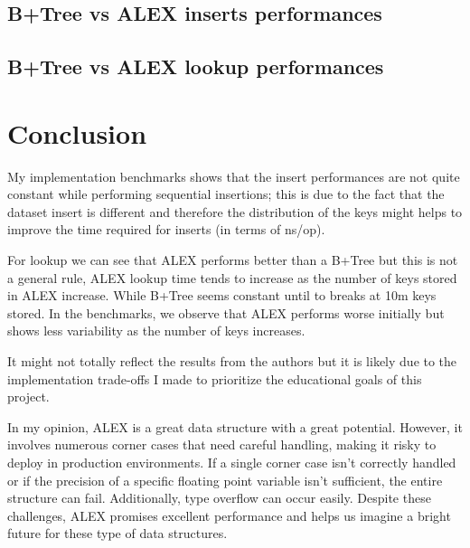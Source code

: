 \section{B+Tree vs ALEX inserts performances}
\section{B+Tree vs ALEX lookup performances}

\let\clearpage\relax
\chapter{Conclusion}
My implementation benchmarks shows that the insert performances are not quite constant while performing sequential insertions; this is due to the fact that the dataset insert is different and therefore the distribution of the keys might helps to improve the time required for inserts (in terms of ns/op).

For lookup we can see that ALEX performs better than a B+Tree but this is not a general rule, ALEX lookup time tends to increase as the number of keys stored in ALEX increase. While B+Tree seems constant until to breaks at 10m keys stored. In the benchmarks, we observe that ALEX performs worse initially but shows less variability as the number of keys increases.

It might not totally reflect the results from the authors but it is likely due to the implementation trade-offs I made to prioritize the educational goals of this project.

In my opinion, ALEX is a great data structure with a great potential. However, it involves numerous corner cases that need careful handling, making it risky to deploy in production environments. If a single corner case isn't correctly handled or if the precision of a specific floating point variable isn't sufficient, the entire structure can fail. Additionally, type overflow can occur easily. Despite these challenges, ALEX promises excellent performance and helps us imagine a bright future for these type of data structures.
